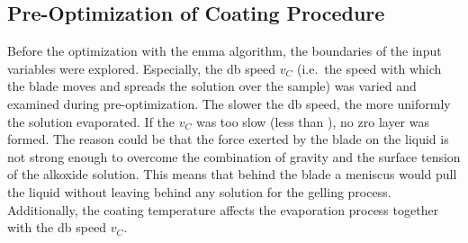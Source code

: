 \subsection{Pre-Optimization of Coating Procedure}
Before the optimization with the \gls{emma} algorithm, 
the boundaries of the input variables were explored. 
Especially, the \gls{db} speed $v_{C}$ (i.e.\ the speed with which the blade moves and spreads the solution over the sample)
was varied and examined during pre-optimization. 
The slower the \gls{db} speed, the more uniformly the solution evaporated. 
If the $v_{C}$ was too slow (less than ), no \gls{zro} layer was formed. 
The reason could be that the force exerted by the blade on the liquid is not strong enough to overcome the combination of gravity and the surface tension of the alkoxide solution.
This means that behind the blade a meniscus would pull the liquid without leaving behind any solution for the gelling process. 
Additionally, the coating temperature affects the evaporation process together with the \gls{db} speed $v_{C}$. 




